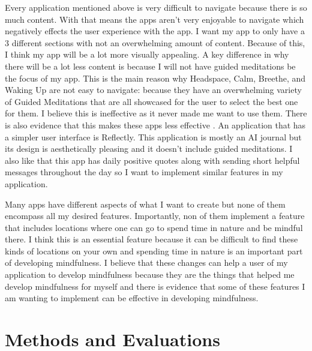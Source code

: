 \documentclass[12pt,twocolumn]{article}
\begin{document}
Every application mentioned above is very difficult to navigate because there is so much content. With that means the apps aren't very enjoyable to navigate which negatively effects the user experience with the app. I want my app to only have a 3 different sections with not an overwhelming amount of content. Because of this, I think my app will be a lot more visually appealing. A key difference in why there will be a lot less content is because I will not have guided meditations be the focus of my app. This is the main reason why Headspace, Calm, Breethe, and Waking Up are not easy to navigate: because they have an overwhelming variety of Guided Meditations that are all showcased for the user to select the best one for them. I believe this is ineffective as it never made me want to use them. There is also evidence that this makes these apps less effective \cite{Eysenbach2015Review}. An application that has a simpler user interface is Reflectly. This application is mostly an AI journal but its design is aesthetically pleasing and it doesn't include guided meditations. I also like that this app has daily positive quotes along with sending short helpful messages throughout the day so I want to implement similar features in my application.

Many apps have different aspects of what I want to create but none of them encompass all my desired features. Importantly, non of them implement a feature that includes locations where one can go to spend time in nature and be mindful there. I think this is an essential feature because it can be difficult to find these kinds of locations on your own and spending time in nature is an important part of developing mindfulness. I believe that these changes can help a user of my application to develop mindfulness because they are the things that helped me develop mindfulness for myself and there is evidence that some of these features I am wanting to implement can be effective in developing mindfulness.

\section{Methods and Evaluations}
\end{document}
